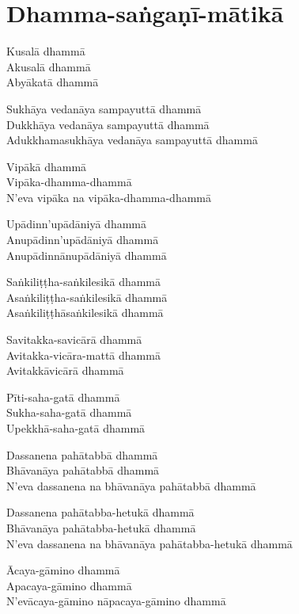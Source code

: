 
\chapter{Dhamma-saṅgaṇī-mātikā}%


\begin{paritta}
Kusalā dhammā\\
Akusalā dhammā\\
Abyākatā dhammā

Sukhāya vedanāya sampayuttā dhammā\\
Dukkhāya vedanāya sampayuttā dhammā\\
Adukkhamasukhāya vedanāya sampayuttā dhammā

Vipākā dhammā\\
Vipāka-dhamma-dhammā\\
N'eva vipāka na vipāka-dhamma-dhammā

Upādinn'upādāniyā dhammā\\
Anupādinn'upādāniyā dhammā\\
Anupādinnānupādāniyā dhammā

Saṅkiliṭṭha-saṅkilesikā dhammā\\
Asaṅkiliṭṭha-saṅkilesikā dhammā\\
Asaṅkiliṭṭhāsaṅkilesikā dhammā

Savitakka-savicārā dhammā\\
Avitakka-vicāra-mattā dhammā\\
Avitakkāvicārā dhammā

Pīti-saha-gatā dhammā\\
Sukha-saha-gatā dhammā\\
Upekkhā-saha-gatā dhammā

\enlargethispage{\baselineskip}

Dassanena pahātabbā dhammā\\
Bhāvanāya pahātabbā dhammā\\
N'eva dassanena na bhāvanāya pahātabbā dhammā

\clearpage

Dassanena pahātabba-hetukā dhammā\\
Bhāvanāya pahātabba-hetukā dhammā\\
N'eva dassanena na bhāvanāya pahātabba-hetukā dhammā

Ācaya-gāmino dhammā\\
Apacaya-gāmino dhammā\\
N'evācaya-gāmino nāpacaya-gāmino dhammā


\end{paritta}
